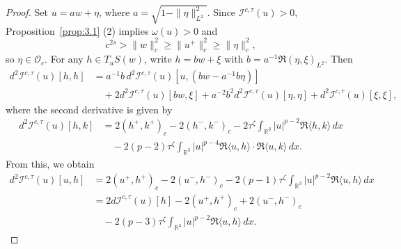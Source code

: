 \documentclass{amsart}
\theoremstyle{plain}
\theoremstyle{definition}
\theoremstyle{remark}
\numberwithin{equation}{section} \numberwithin{figure}{section}
\begin{document}
  \begin{proof}
  Set \( u = a w + \eta \), where \( a = \sqrt{1 - \|\eta\|_{L^2}^2} \). Since \( \mathcal{I}^{c,\tau}(u) > 0 \), Proposition~\ref{prop:3.1} (2) implies \( \omega(u) > 0 \) and
  \[
  c^{2s} > \|w\|_c^2 \geq \|u^+\|_c^2 \geq \|\eta\|_c^2,
  \]
  so \( \eta \in \mathscr{O}_c \). For any \( h \in T_u S(w) \), write \( h = b w + \xi \) with \( b = a^{-1} \Re(\eta, \xi)_{L^2} \). Then
  \begin{equation}\label{prop3.3.1}
  \begin{aligned}
  d^2\mathcal{I}^{c,\tau}(u)[h, h]
  &= a^{-1} b \, d^2\mathcal{I}^{c,\tau}(u)[u, (b w - a^{-1} b \eta)] \\
  &\quad + 2 d^2\mathcal{I}^{c,\tau}(u)[b w, \xi] + a^{-2} b^2 d^2\mathcal{I}^{c,\tau}(u)[\eta, \eta] + d^2\mathcal{I}^{c,\tau}(u)[\xi, \xi],
  \end{aligned}
  \end{equation}
  where the second derivative is given by
  \begin{equation}\label{second_de}
  \begin{split}
  d^2\mathcal{I}^{c,\tau}(u)[h, k]
  &= 2 (h^+, k^+)_c - 2 (h^-, k^-)_c - 2\tau^{\zeta} \int_{\mathbb{R}^3} |u|^{p-2} \Re\langle h, k \rangle \, dx \\
  &\quad - 2(p - 2)\tau^{\zeta} \int_{\mathbb{R}^3} |u|^{p-4} \Re\langle u, h \rangle \cdot \Re\langle u, k \rangle \, dx.
  \end{split}
  \end{equation}
  From this, we obtain
  \begin{equation}
  \begin{split}
  d^2\mathcal{I}^{c,\tau}(u)[u, h]
  &= 2 (u^+, h^+)_c - 2 (u^-, h^-)_c - 2(p - 1)\tau^{\zeta} \int_{\mathbb{R}^3} |u|^{p-2} \Re\langle u, h \rangle \, dx \\
  &= 2 d\mathcal{I}^{c,\tau}(u)[h] - 2 (u^+, h^+)_c + 2 (u^-, h^-)_c \\
  &\quad - 2(p - 3)\tau^{\zeta} \int_{\mathbb{R}^3} |u|^{p-2} \Re\langle u, h \rangle \, dx.
  \end{split}
  \end{equation}
  

\end{proof}
\end{document}
